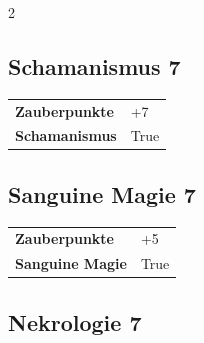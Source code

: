 \begin{multicols}{2}
\begin{tcolorbox}

\end{tcolorbox}

\begin{tcolorbox}
    \subsection*{Schamanismus \hfill \small{7 }}
    \tcblower




\begin{tabular}{@{}ll@{}}
    \textbf{Zauberpunkte} & +7\\
    \textbf{Schamanismus} & True\\
\end{tabular}


\end{tcolorbox}

\begin{tcolorbox}
    \subsection*{Sanguine Magie \hfill \small{7 }}
    \tcblower




\begin{tabular}{@{}ll@{}}
    \textbf{Zauberpunkte} & +5\\
    \textbf{Sanguine Magie} & True\\
\end{tabular}


\end{tcolorbox}

\begin{tcolorbox}
    \subsection*{Nekrologie \hfill \small{7 }}
    \tcblower





\end{tcolorbox}
\end{multicols}
